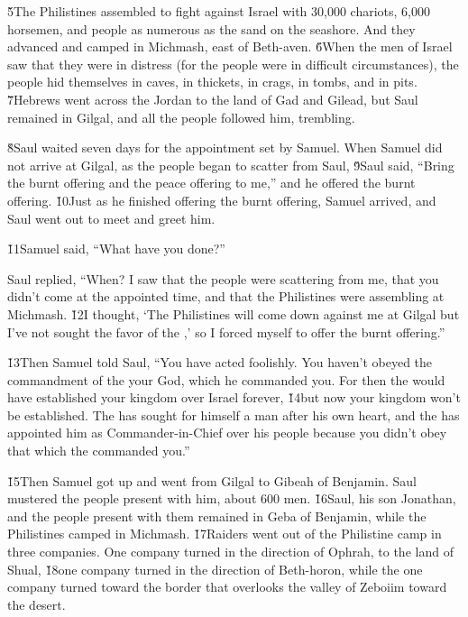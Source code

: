 \v{5}The Philistines assembled to fight against Israel with 30,000 chariots, 6,000 horsemen, and people as numerous as the sand on the seashore. And they advanced and camped in Michmash, east of Beth-aven. \v{6}When the men of Israel saw that they were in distress (for the people were in difficult circumstances), the people hid themselves in caves, in thickets, in crags, in tombs, and in pits. \v{7}Hebrews went across the Jordan to the land of Gad and Gilead, but Saul remained in Gilgal, and all the people followed him, trembling.

\v{8}Saul waited seven days for the appointment set by Samuel. When Samuel did not arrive at Gilgal, as the people began to scatter from Saul, \v{9}Saul said, ``Bring the burnt offering and the peace offering to me,'' and he offered the burnt offering. \v{10}Just as he finished offering the burnt offering, Samuel arrived, and Saul went out to meet and greet him.

\v{11}Samuel said, ``What have you done?''

Saul replied, ``When? I saw that the people were scattering from me, that you didn't come at the appointed time, and that the Philistines were assembling at Michmash. \v{12}I thought, `The Philistines will come down against me at Gilgal but I've not sought the favor of the ,' so I forced myself to offer the burnt offering.''

\v{13}Then Samuel told Saul, ``You have acted foolishly. You haven't obeyed the commandment of the  your God, which he commanded you. For then the  would have established your kingdom over Israel forever, \v{14}but now your kingdom won't be established. The  has sought for himself a man after his own heart, and the  has appointed him as Commander-in-Chief over his people because you didn't obey that which the  commanded you.''

\v{15}Then Samuel got up and went from Gilgal to Gibeah of Benjamin. Saul mustered the people present with him, about 600 men. \v{16}Saul, his son Jonathan, and the people present with them remained in Geba of Benjamin, while the Philistines camped in Michmash. \v{17}Raiders went out of the Philistine camp in three companies. One company turned in the direction of Ophrah, to the land of Shual, \v{18}one company turned in the direction of Beth-horon, while the one company turned toward the border that overlooks the valley of Zeboiim toward the desert.

